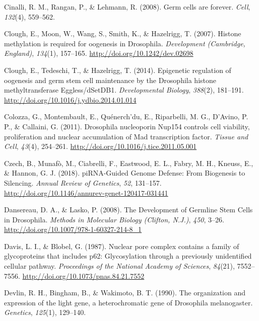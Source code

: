 \documentclass[12pt,oneside]{reedthesis}
\begin{document}
\leavevmode\hypertarget{ref-cinalliGermCellsAre2008}{}%
Cinalli, R. M., Rangan, P., \& Lehmann, R. (2008). Germ cells are forever. \emph{Cell}, \emph{132}(4), 559--562.

\leavevmode\hypertarget{ref-cloughHistoneMethylationRequired2007a}{}%
Clough, E., Moon, W., Wang, S., Smith, K., \& Hazelrigg, T. (2007). Histone methylation is required for oogenesis in Drosophila. \emph{Development (Cambridge, England)}, \emph{134}(1), 157--165. \url{http://doi.org/10.1242/dev.02698}

\leavevmode\hypertarget{ref-cloughEpigeneticRegulationOogenesis2014}{}%
Clough, E., Tedeschi, T., \& Hazelrigg, T. (2014). Epigenetic regulation of oogenesis and germ stem cell maintenance by the Drosophila histone methyltransferase Eggless/dSetDB1. \emph{Developmental Biology}, \emph{388}(2), 181--191. \url{http://doi.org/10.1016/j.ydbio.2014.01.014}

\leavevmode\hypertarget{ref-colozzaDrosophilaNucleoporinNup1542011}{}%
Colozza, G., Montembault, E., Quénerch'du, E., Riparbelli, M. G., D'Avino, P. P., \& Callaini, G. (2011). Drosophila nucleoporin Nup154 controls cell viability, proliferation and nuclear accumulation of Mad transcription factor. \emph{Tissue and Cell}, \emph{43}(4), 254--261. \url{http://doi.org/10.1016/j.tice.2011.05.001}

\leavevmode\hypertarget{ref-czechPiRNAGuidedGenomeDefense2018}{}%
Czech, B., Munafò, M., Ciabrelli, F., Eastwood, E. L., Fabry, M. H., Kneuss, E., \& Hannon, G. J. (2018). piRNA-Guided Genome Defense: From Biogenesis to Silencing. \emph{Annual Review of Genetics}, \emph{52}, 131--157. \url{http://doi.org/10.1146/annurev-genet-120417-031441}

\leavevmode\hypertarget{ref-dansereauDevelopmentGermlineStem2008}{}%
Dansereau, D. A., \& Lasko, P. (2008). The Development of Germline Stem Cells in Drosophila. \emph{Methods in Molecular Biology (Clifton, N.J.)}, \emph{450}, 3--26. \url{http://doi.org/10.1007/978-1-60327-214-8_1}

\leavevmode\hypertarget{ref-davisNuclearPoreComplex1987}{}%
Davis, L. I., \& Blobel, G. (1987). Nuclear pore complex contains a family of glycoproteins that includes p62: Glycosylation through a previously unidentified cellular pathway. \emph{Proceedings of the National Academy of Sciences}, \emph{84}(21), 7552--7556. \url{http://doi.org/10.1073/pnas.84.21.7552}

\leavevmode\hypertarget{ref-devlinOrganizationExpressionLight1990}{}%
Devlin, R. H., Bingham, B., \& Wakimoto, B. T. (1990). The organization and expression of the light gene, a heterochromatic gene of Drosophila melanogaster. \emph{Genetics}, \emph{125}(1), 129--140.
\end{document}
